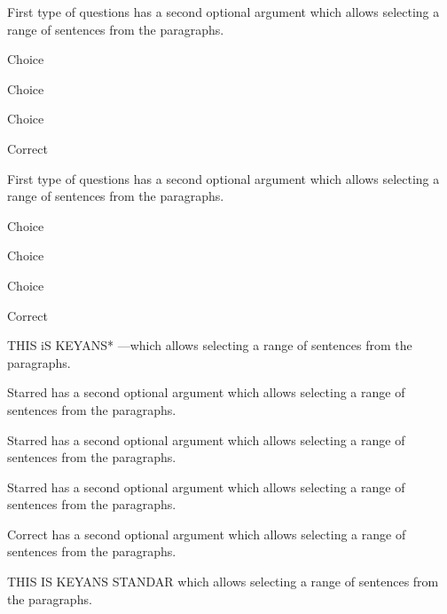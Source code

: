 \documentclass{article}
\begin{document}
\begin{enumext}[nosep,align=center,save-ans=mytest,show-ans=true,check-ans=true,save-ref=true,widest=99]
\item* First type of questions %
has a second optional argument
which allows selecting a range of sentences from the paragraphs.

\begin{keyans*}[itemindent=0.5cm,columns=2,columns-sep=1cm]
  \item Choice
  \item Choice
  \item Choice
  \item*[XY]Correct
\end{keyans*}

\item* First type of questions %
has a second optional argument
which allows selecting a range of sentences from the paragraphs.

\begin{keyans}[itemindent=0.5cm,columns=2,columns-sep=1cm]
  \item Choice
  \item Choice
  \columnbreak
  \item Choice
  \item*[XY] Correct
\end{keyans}


\item THIS iS KEYANS* ---which allows selecting a range of sentences from the paragraphs.

\begin{keyans*}[columns=2,columns-sep=1cm,show-ans=false]
  \item Starred has a second optional argument
which allows selecting a range of sentences from the paragraphs.
  \item Starred has a second optional argument
which allows selecting a range of sentences from the paragraphs.
  \item Starred has a second optional argument
which allows selecting a range of sentences from the paragraphs.
  \item*[X] Correct has a second optional argument
which allows selecting a range of sentences from the paragraphs.
\end{keyans*}

\item THIS IS KEYANS STANDAR
which allows selecting a range of sentences from the paragraphs.


\end{enumext}
\end{document}
